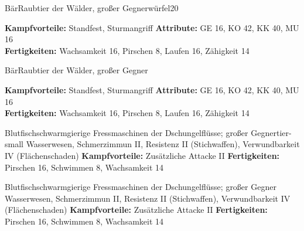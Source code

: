 \documentclass[linksbund,ATvorVT]{rpg-ilaris}
\begin{document}
\begin{multicols}{2}[
		\chapter*{} %
	]


\begin{gegner}{Bär}{Raubtier der Wälder, großer Gegner}{würfel20}%
	{}
	{}%

	\textbf{Kampfvorteile:} Standfest, Sturmangriff
\trennlinie
	\textbf{Attribute:} GE 16, KO 42, KK 40, MU 16 \\
	\textbf{Fertigkeiten:} Wachsamkeit 16, Pirschen 8, Laufen 16, Zähigkeit 14
\end{gegner}
\begin{gegner}{Bär}{Raubtier der Wälder, großer Gegner}{}%
	{}
	{}%

	\textbf{Kampfvorteile:} Standfest, Sturmangriff
\trennlinie
	\textbf{Attribute:} GE 16, KO 42, KK 40, MU 16 \\
	\textbf{Fertigkeiten:} Wachsamkeit 16, Pirschen 8, Laufen 16, Zähigkeit 14
\end{gegner}
\begin{gegner}{Blutfischschwarm}{gierige Fressmaschinen der Dschungelflüsse; großer Gegner}{tier-small}
	{
	}{Wasserwesen, Schmerzimmun II, Resistenz II (Stichwaffen), Verwundbarkeit IV (Flächenschaden) }
	\textbf{Kampfvorteile:} Zusätzliche Attacke II
\trennlinie
	\textbf{Fertigkeiten:} Pirschen 16, Schwimmen 8, Wachsamkeit 14
\end{gegner}

\begin{gegner}{Blutfischschwarm}{gierige Fressmaschinen der Dschungelflüsse; großer Gegner}{}
	{ }
	{Wasserwesen, Schmerzimmun II, Resistenz II (Stichwaffen), Verwundbarkeit IV (Flächenschaden)}
	\textbf{Kampfvorteile:} Zusätzliche Attacke II
\trennlinie
	\textbf{Fertigkeiten:} Pirschen 16, Schwimmen 8, Wachsamkeit 14
\end{gegner}


\end{multicols}
\end{document}
